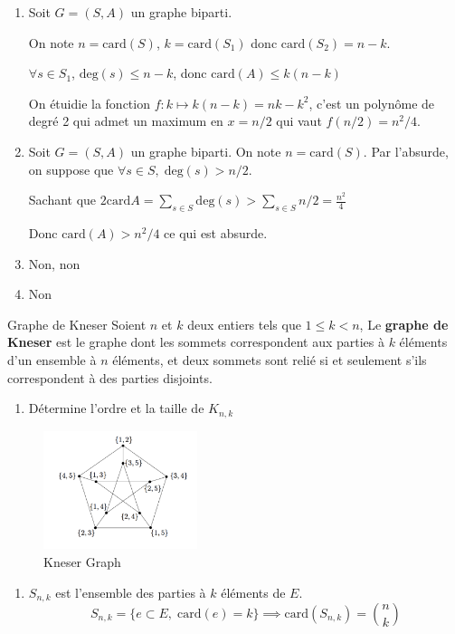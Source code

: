 \begin{myproof}
\begin{enumerate}
    \item Soit $G = (S,A)$ un graphe biparti.

        On note $n = \mathrm{car d}(S)$, $k = \mathrm{car d} (S_1)$ donc $\mathrm{car d} (S_2) = n-k$.

        $\forall s \in S_1$, $\mathrm{deg} (s) \le n-k$, donc $\mathrm{car d} (A) \le k(n-k)$

        On étuidie la fonction $f: k \mapsto k(n-k) = nk -k^{2}$, c'est un polynôme de degré 2 qui admet un maximum en $x = n / 2$ qui vaut  $f(n / 2) = n^{2} / 4$.

    \item Soit $G= (S,A)$ un graphe biparti. On note $n = \mathrm{car d} (S)$. Par l'absurde, on suppose que $\forall s \in S, \; \mathrm{deg} (s) > n / 2$.

        Sachant que $2 \mathrm{card} A = \sum_{s \in S} \mathrm{deg} (s) > \sum _{s \in S} n/2 = \frac{n^{2}}{4} $

        Donc $\mathrm{car d} (A) > n^{2} / 4$ ce qui est absurde.
    \item Non, non
    \item Non
\end{enumerate}

\end{myproof}

\begin{question}{Graphe de Kneser}{}
  Soient $n$ et $k$ deux entiers tels que $1 \le k < n$, Le \textbf{graphe de Kneser} est le graphe dont les sommets correspondent aux parties à $k$ éléments d'un ensemble à $n$ éléments, et deux sommets sont relié si et seulement s'ils correspondent à des parties disjoints.
\begin{enumerate}
  \item Détermine l'ordre et la taille de $K _{n,k}$
\end{enumerate}
\begin{figure}[H] %
    \centering
    \includegraphics[width=0.4\textwidth]{./assets/Kneser Graph.png}
    \caption{Kneser Graph}
    \label{fig:Kneser-Graph}
\end{figure}


\end{question}

\begin{myproof}{}{}
\begin{enumerate}
  \item $S _{n,k}$ est l'ensemble des parties à $k$ éléments de $E$. 
    \[
      S _{n,k} = \{ e \subset E, \; \mathrm{card}(e) = k\} \implies \mathrm{card}(S _{n,k}) = \binom{n}{k}
    \]
\end{enumerate}
\end{myproof}


